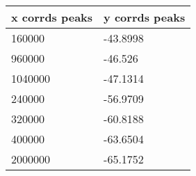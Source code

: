 \begin{tabular}{ll}
x corrds peaks & y corrds peaks \\ 
\hline 
160000 & -43.8998 \\ 
960000 & -46.526 \\ 
1040000 & -47.1314 \\ 
240000 & -56.9709 \\ 
320000 & -60.8188 \\ 
400000 & -63.6504 \\ 
2000000 & -65.1752 \\ 
\hline 
\end{tabular}